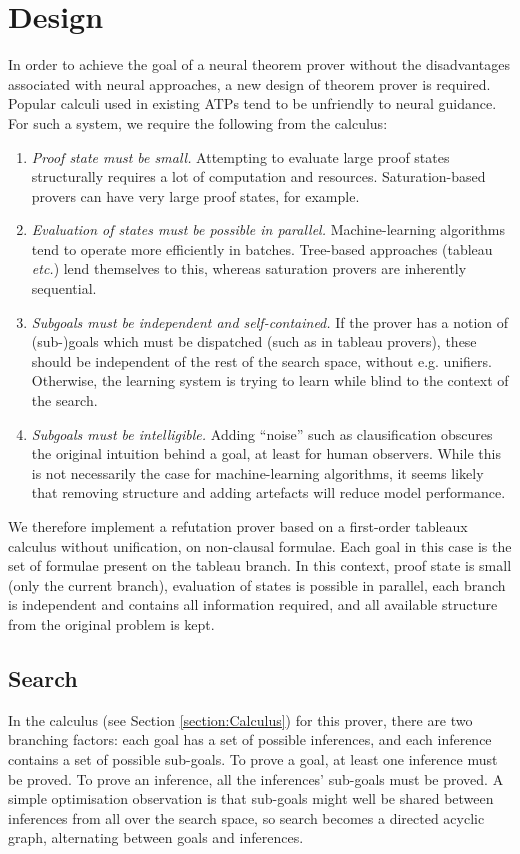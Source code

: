\documentclass[runningheads]{llncs}
\begin{document}
\section{Design}
\label{section:Design}
In order to achieve the goal of a neural theorem prover without the disadvantages associated with neural approaches, a new design of theorem prover is required.
Popular calculi used in existing ATPs tend to be unfriendly to neural guidance.
For such a system, we require the following from the calculus:
\begin{enumerate}
        \item \emph{Proof state must be small.} Attempting to evaluate large proof states structurally requires a lot of computation and resources. Saturation-based provers can have very large proof states, for example.
        \item \emph{Evaluation of states must be possible in parallel.} Machine-learning algorithms tend to operate more efficiently in batches. Tree-based approaches (tableau \emph{etc.}) lend themselves to this, whereas saturation provers are inherently sequential.
        \item \emph{Subgoals must be independent and self-contained.} If the prover has a notion of (sub-)goals which must be dispatched (such as in tableau provers), these should be independent of the rest of the search space, without e.g. unifiers. Otherwise, the learning system is trying to learn while blind to the context of the search.
	\item \emph{Subgoals must be intelligible.} Adding ``noise'' such as clausification obscures the original intuition behind a goal, at least for human observers. While this is not necessarily the case for machine-learning algorithms, it seems likely that removing structure and adding artefacts will reduce model performance.
\end{enumerate}
We therefore implement a refutation prover based on a first-order tableaux calculus without unification, on non-clausal formulae.
Each goal in this case is the set of formulae present on the tableau branch.
In this context, proof state is small (only the current branch), evaluation of states is possible in parallel, each branch is independent and contains all information required, and all available structure from the original problem is kept.

\subsection{Search}
In the calculus (see Section \ref{section:Calculus}) for this prover, there are two branching factors: each goal has a set of possible inferences, and each inference contains a set of possible sub-goals.
To prove a goal, at least one inference must be proved.
To prove an inference, all the inferences' sub-goals must be proved.
A simple optimisation observation is that sub-goals might well be shared between inferences from all over the search space, so search becomes a directed acyclic graph, alternating between goals and inferences.
\end{document}
